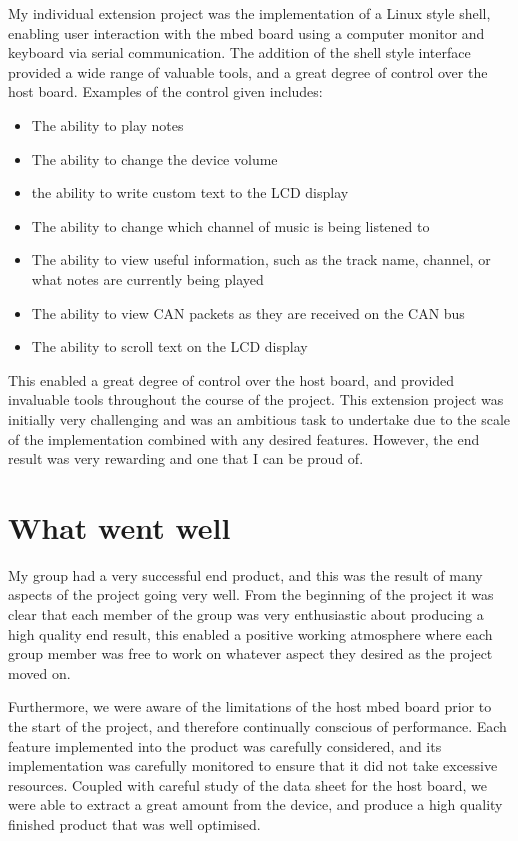 My individual extension project was the implementation of a Linux style shell, 
enabling user interaction with the mbed board using a computer monitor and 
keyboard via serial communication. The addition of the shell style interface 
provided a wide range of valuable tools, and a great degree of control over the 
host board. Examples of the control given includes: 
\begin{itemize}
    \item The ability to play notes
    \item The ability to change the device volume
    \item the ability to write custom text to the LCD display 
    \item The ability to change which channel of music is being listened to
    \item The ability to view useful information, such as the track name, channel,
or what notes are currently being played
    \item The ability to view CAN packets as they are received on the CAN bus 
    \item The ability to scroll text on the LCD display 
\end{itemize}
This enabled a great degree of control over the host board, and provided 
invaluable tools throughout the course of the project. This extension project 
was initially very challenging and was an ambitious task to undertake due to the 
scale of the implementation combined with any desired features. However, the end 
result was very rewarding and one that I can be proud of. 

\section{What went well}

My group had a very successful end product, and this was the result of many 
aspects of the project going very well. From the beginning of the project it was 
clear that each member of the group was very enthusiastic about producing a high 
quality end result, this enabled a positive working atmosphere where each group 
member was free to work on whatever aspect they desired as the project moved on.
\par\bigskip\noindent
Furthermore, we were aware of the limitations of the host mbed board prior to the 
start of the project, and therefore continually conscious of performance. Each 
feature implemented into the product was carefully considered, and its 
implementation was carefully monitored to ensure that it did not take excessive 
resources. Coupled with careful study of the data sheet for the host board, we 
were able to extract a great amount from the device, and produce a high quality 
finished product that was well optimised. 

